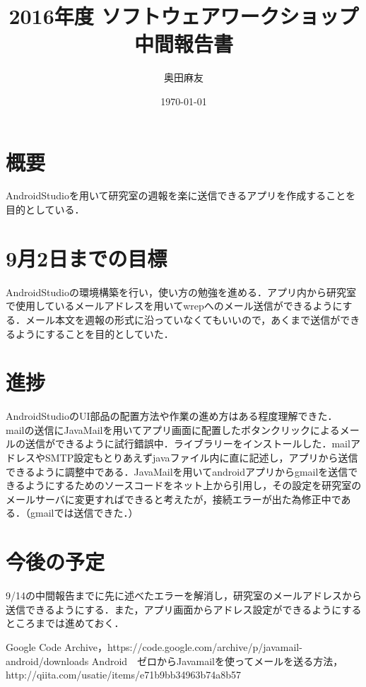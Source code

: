 \documentclass[a4j]{jarticle}
\title{2016年度 ソフトウェアワークショップ中間報告書}
\author{奥田麻友}
\date{\today}
\begin{document}
\maketitle
\section{概要}
AndroidStudioを用いて研究室の週報を楽に送信できるアプリを作成することを目的としている．

\section{9月2日までの目標}
AndroidStudioの環境構築を行い，使い方の勉強を進める．アプリ内から研究室で使用しているメールアドレスを用いてwrepへのメール送信ができるようにする．メール本文を週報の形式に沿っていなくてもいいので，あくまで送信ができるようにすることを目的としていた．

\section{進捗}
AndroidStudioのUI部品の配置方法や作業の進め方はある程度理解できた．\\
mailの送信にJavaMailを用いてアプリ画面に配置したボタンクリックによるメールの送信ができるように試行錯誤中．ライブラリー\cite{c2}をインストールした．mailアドレスやSMTP設定もとりあえずjavaファイル内に直に記述し，アプリから送信できるように調整中である．JavaMailを用いてandroidアプリからgmailを送信できるようにするためのソースコードをネット上から引用し\cite{c1}，その設定を研究室のメールサーバに変更すればできると考えたが，接続エラーが出た為修正中である．（gmailでは送信できた．）


\section{今後の予定}
9/14の中間報告までに先に述べたエラーを解消し，研究室のメールアドレスから送信できるようにする．また，アプリ画面からアドレス設定ができるようにするところまでは進めておく．



\begin{thebibliography}{2}
 Google Code Archive，https://code.google.com/archive/p/javamail-android/downloads
 Android　ゼロからJavamailを使ってメールを送る方法，http://qiita.com/usatie/items/e71b9bb34963b74a8b57
\end{thebibliography}
\end{document}
